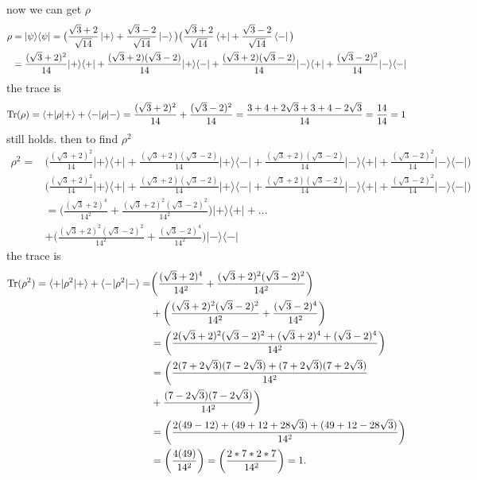 \documentclass{article}
\newcommand{\op}[2]{|#1\rangle \langle#2|}
\newcommand{\sand}[3]{\braket{#1 | #2 | #3}}
\begin{document}
now we can get $\rho$
\begin{align*}
    \rho &= \op{\psi}{\psi} = \big(\frac{\sqrt{3}+2}{\sqrt{14}}\ket{+} + \frac{\sqrt{3}-2}{\sqrt{14}}\ket{-}\big)\big(\frac{\sqrt{3}+2}{\sqrt{14}}\bra{+} + \frac{\sqrt{3}-2}{\sqrt{14}}\bra{-}\big) \\
    &= \frac{(\sqrt{3}+2)^2}{14}\op{+}{+} + \frac{(\sqrt{3}+2)(\sqrt{3}-2)}{14}\op{+}{-} + \frac{(\sqrt{3}+2)(\sqrt{3}-2)}{14}\op{-}{+} + \frac{(\sqrt{3}-2)^2}{14}\op{-}{-}
\end{align*}
the trace is
\begin{align*}
    \text{Tr}(\rho) = \sand{+}{\rho}{+} + \sand{-}{\rho}{-} = \frac{(\sqrt{3}+2)^2}{14} + \frac{(\sqrt{3}-2)^2}{14} = \frac{3 + 4 + 2\sqrt{3} + 3 + 4 - 2\sqrt{3}}{14} = \frac{14}{14} = 1
\end{align*}
still holds. then to find $\rho^2$
\begin{align*}
    \rho^2 = &\bigg(\frac{(\sqrt{3}+2)^2}{14}\op{+}{+} + \frac{(\sqrt{3}+2)(\sqrt{3}-2)}{14}\op{+}{-} + \frac{(\sqrt{3}+2)(\sqrt{3}-2)}{14}\op{-}{+} + \frac{(\sqrt{3}-2)^2}{14}\op{-}{-}\bigg) \\
    &\bigg(\frac{(\sqrt{3}+2)^2}{14}\op{+}{+} + \frac{(\sqrt{3}+2)(\sqrt{3}-2)}{14}\op{+}{-} + \frac{(\sqrt{3}+2)(\sqrt{3}-2)}{14}\op{-}{+} + \frac{(\sqrt{3}-2)^2}{14}\op{-}{-}\bigg) \\
    &= \bigg(\frac{(\sqrt{3}+2)^4}{14^2} + \frac{(\sqrt{3}+2)^2(\sqrt{3}-2)^2}{14^2}\bigg)\op{+}{+} + ... \\&+ \bigg(\frac{(\sqrt{3}+2)^2(\sqrt{3}-2)^2}{14^2} + \frac{(\sqrt{3}-2)^4}{14^2}\bigg)\op{-}{-}
\end{align*}
the trace is
\begin{align*}
    \text{Tr}(\rho^2) = \sand{+}{\rho^2}{+} + \sand{-}{\rho^2}{-} =  &\bigg(\frac{(\sqrt{3}+2)^4}{14^2} + \frac{(\sqrt{3}+2)^2(\sqrt{3}-2)^2}{14^2}\bigg) \\&+ \bigg(\frac{(\sqrt{3}+2)^2(\sqrt{3}-2)^2}{14^2} + \frac{(\sqrt{3}-2)^4}{14^2}\bigg) \\
    &= \bigg(\frac{2(\sqrt{3}+2)^2(\sqrt{3}-2)^2 + (\sqrt{3}+2)^4 + (\sqrt{3}-2)^4}{14^2}\bigg) \\
    &= \bigg(\frac{2(7+2\sqrt{3})(7-2\sqrt{3}) + (7+2\sqrt{3})(7+2\sqrt{3})}{14^2} \\&+ 
    \frac{(7-2\sqrt{3})(7-2\sqrt{3})}{14^2}\bigg) \\
    &= \bigg(\frac{2(49-12)+(49+12+28\sqrt{3})+(49+12-28\sqrt{3})}{14^2}\bigg) \\
    &= \bigg(\frac{4(49)}{14^2}\bigg) = \bigg(\frac{2*7*2*7}{14^2}\bigg) = 1.
\end{align*}
\end{document}
